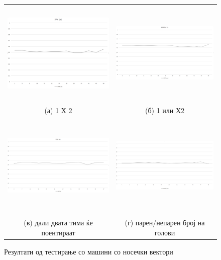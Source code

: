 \begin{figure}[H]
\centering
\begin{tabular}{cc}
  \includegraphics[width=8cm,height=5cm]{images/svm_1x2.png} &   
  \includegraphics[width=8cm,height=5cm]{images/svm_1_or_x2.png} \\
(а) 1 Х 2 & (б) 1 или Х2 \\
 \includegraphics[width=8cm,height=5cm]{images/svm_bts.png}
 &   
 \includegraphics[width=8cm,height=5cm]{images/svm_odd_even.png} \\
(в) дали двата тима ќе поентираат & (г) парен/непарен број на голови \\
\end{tabular}
\caption{Резултати од тестирање со машини со носечки вектори}
\label{fig:svm}
\end{figure}

